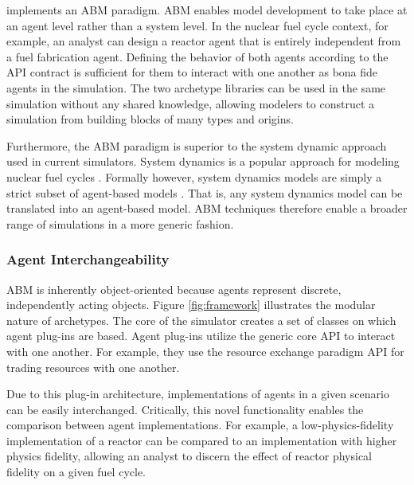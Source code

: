 \Cyclus implements an \acrlong{ABM} paradigm. \gls{ABM} enables model
development to take place at an agent level rather than a system level. In the
nuclear fuel cycle context, for example, an analyst can design a reactor agent
that is entirely independent from a fuel fabrication agent. Defining the
behavior of both agents according to the
\gls{API} contract is sufficient for them to interact with one another as
bona fide agents in the simulation.  The two archetype libraries can be used in
the same simulation without any shared knowledge, allowing modelers to
construct a simulation from building blocks of many types and origins.

Furthermore, the \gls{ABM} paradigm is superior to the system dynamic approach used in
current simulators.
System dynamics is a popular approach for modeling nuclear fuel cycles
\cite{jacobson_vision_2009,van_den_durpel_daness_2009,guerin_impact_2009,guerin_benchmark_2009}.
Formally however, system dynamics models are simply a strict subset of agent-based models
\cite{macal_agent-based_2010}.
That is, any system dynamics model can be translated
into an agent-based model.
\gls{ABM} techniques therefore enable a broader range of simulations in a more
generic fashion.

\subsubsection{Agent Interchangeability}\label{sec:interchangeability}


\gls{ABM} is inherently object-oriented because agents represent discrete,
independently acting objects.  Figure \ref{fig:framework} illustrates the
modular nature of \Cyclus archetypes.  The core of the \Cyclus simulator creates
a set of classes on which agent plug-ins are based.  Agent plug-ins utilize the
generic core \gls{API} to interact with one another.  For example, they use the
resource exchange paradigm \gls{API} for trading resources with one another.

Due to this plug-in architecture,
implementations of agents in a given scenario can be easily
interchanged. Critically, this novel functionality enables the comparison
between agent implementations. For example, a low-physics-fidelity
implementation of a reactor can be compared to an implementation with higher
physics fidelity, allowing an analyst to discern the effect of reactor physical
fidelity on a given fuel cycle.

